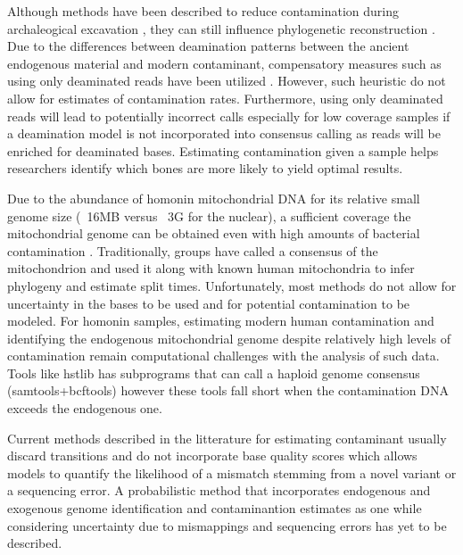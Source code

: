 \documentclass[a4paper,12pt]{article}
\begin{document}
Although methods have been described to reduce contamination during archaleogical excavation \cite{yang2005contamination}, they can still influence phylogenetic reconstruction \cite{wall2007inconsistencies}. Due to the differences between deamination patterns between the ancient endogenous material and modern contaminant, compensatory measures such as using only deaminated reads have been utilized \cite{skoglund2014separating}. However, such heuristic do not allow for estimates of contamination rates. Furthermore, using only deaminated reads will lead to potentially incorrect calls especially for low coverage samples if a deamination model is not incorporated into consensus calling as reads will be enriched for deaminated bases. Estimating contamination given a sample helps researchers identify which bones are more likely to yield optimal results. 

Due to the abundance of homonin mitochondrial DNA for its relative small genome size (~16MB versus ~3G for the nuclear), a sufficient coverage the mitochondrial genome can be obtained even with high amounts of bacterial contamination \cite{first neandertal paper}. Traditionally, groups have called a consensus of the mitochondrion and used it along with known human mitochondria to infer phylogeny and estimate split times. Unfortunately, most methods do not allow for uncertainty in the bases to be used and for potential contamination to be modeled. For homonin samples, estimating modern human contamination and identifying the endogenous mitochondrial genome despite relatively high levels of contamination remain computational challenges with the analysis of such data. Tools like hstlib\cite{lh3 github} has subprograms that can call a haploid genome consensus (samtools+bcftools) however these tools fall short when the contamination DNA exceeds the endogenous one. 

Current methods described in the litterature for estimating contaminant usually discard transitions and do not incorporate base quality scores which allows models to quantify the likelihood of a mismatch stemming from a novel variant or a sequencing error. A probabilistic method that incorporates endogenous and exogenous genome identification and contaminantion estimates as one while considering uncertainty due to mismappings and sequencing errors has yet to be described. 

\end{document}
